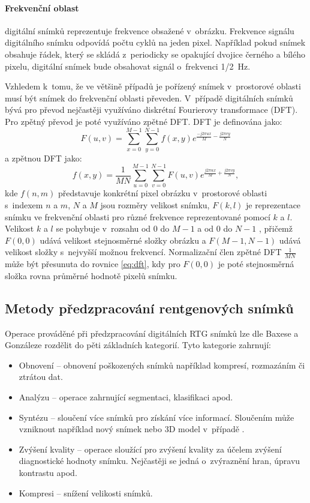 \paragraph{Frekvenční oblast}
digitální snímků reprezentuje frekvence obsažené v~obrázku. Frekvence signálu digitálního snímku odpovídá počtu cyklů na jeden pixel. Například pokud snímek obsahuje řádek, který se skládá z~periodicky se opakující dvojice černého a bílého pixelu, digitální snímek bude obsahovat signál o~frekvenci \SI{1/2}{\hertz}. 

Vzhledem k~tomu, že ve většině případů je pořízený snímek v~prostorové oblasti musí být snímek do frekvenční oblasti převeden. V~případě digitálních snímků bývá pro převod nejčastěji využíváno diskrétní Fourierovy transformace (DFT). Pro zpětný převod je poté využíváno zpětné DFT. DFT je definována jako:
\begin{equation}
\label{eq:dft}
F(u,v)=\sum_{x=0}^{M-1} \sum_{y=0}^{N-1} f(x,y) e^{\frac{-j2\pi ux}{M} - \frac{j2\pi vy}{N}}
\end{equation}
a zpětnou DFT jako:
\begin{equation}
f(x,y)=\frac{1}{MN}\sum_{u=0}^{M-1}\sum_{v=0}^{N-1}F(u,v)e^{\frac{j2\pi ux}{M}+\frac{j2\pi vy}{N}},
\end{equation}
kde $f(n,m)$ představuje konkrétní pixel obrázku v~prostorové oblasti s~indexem $n$ a $m$, $N$ a $M$ jsou rozměry velikost snímku, $F(k,l)$ je reprezentace snímku ve frekvenční oblasti pro různé frekvence reprezentované pomocí $k$ a $l$. Velikost $k$ a $l$ se pohybuje v~rozsahu od 0 do $M-1$ a od 0 do $N-1$
, přičemž $F(0,0)$ udává velikost stejnosměrné složky obrázku a $F(M-1,N-1)$ udává velikost složky s~nejvyšší možnou frekvencí. Normalizační člen zpětné DFT $\frac{1}{MN}$ může být přesunuta do rovnice \ref{eq:dft}, kdy pro $F(0,0)$ je poté stejnosměrná složka rovna průměrné hodnotě pixelů snímku.

\subsection{Metody předzpracování rentgenových snímků}
Operace prováděné při předzpracování digitálních RTG snímků lze dle Baxese \cite{baxes} a Gonzáleze \cite{Gonzalez} rozdělit do pěti základních kategorií. Tyto kategorie zahrnují:
\begin{itemize}
\item Obnovení -- obnovení poškozených snímků například kompresí, rozmazáním či ztrátou dat.
\item Analýzu -- operace zahrnující segmentaci, klasifikaci apod. 
\item Syntézu -- sloučení více snímků pro získání více informací. Sloučením může vzniknout například nový snímek nebo 3D model v~případě .
\item Zvýšení kvality -- operace sloužící pro zvýšení kvality za účelem zvýšení diagnostické hodnoty snímku. Nejčastěji se jedná o~zvýraznění hran, úpravu kontrastu apod.
\item Kompresi -- snížení velikosti snímků.
\end{itemize}

